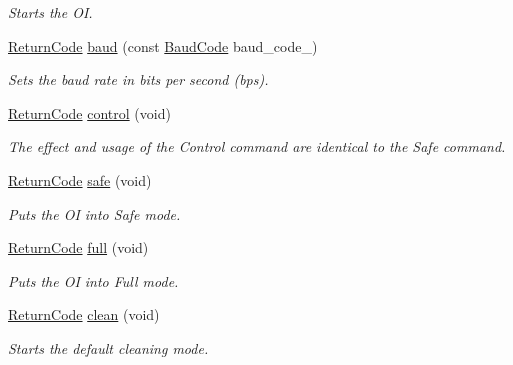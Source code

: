 \begin{DoxyCompactItemize}
\begin{DoxyCompactList}\small\item\em Starts the O\+I. \end{DoxyCompactList}\item 
\hyperlink{classroomba_1_1series500_1_1oi_1_1_o_i_command_ab408b9562318caf292794d8ba335d5ed}{Return\+Code} \hyperlink{classroomba_1_1series500_1_1oi_1_1_o_i_command_a664f31d7b82085b64bae23e1a6f9f516}{baud} (const \hyperlink{namespaceroomba_1_1series500_1_1oi_ae5028fe52e1dabe309aff04a45581bfd}{Baud\+Code} baud\+\_\+code\+\_\+)
\begin{DoxyCompactList}\small\item\em Sets the baud rate in bits per second (bps). \end{DoxyCompactList}\item 
\hyperlink{classroomba_1_1series500_1_1oi_1_1_o_i_command_ab408b9562318caf292794d8ba335d5ed}{Return\+Code} \hyperlink{classroomba_1_1series500_1_1oi_1_1_o_i_command_ad19717e95684fb6d603741315b333551}{control} (void)
\begin{DoxyCompactList}\small\item\em The effect and usage of the Control command are identical to the Safe command. \end{DoxyCompactList}\item 
\hyperlink{classroomba_1_1series500_1_1oi_1_1_o_i_command_ab408b9562318caf292794d8ba335d5ed}{Return\+Code} \hyperlink{classroomba_1_1series500_1_1oi_1_1_o_i_command_a3bb456935cf703ff770ef8dac5409739}{safe} (void)
\begin{DoxyCompactList}\small\item\em Puts the O\+I into Safe mode. \end{DoxyCompactList}\item 
\hyperlink{classroomba_1_1series500_1_1oi_1_1_o_i_command_ab408b9562318caf292794d8ba335d5ed}{Return\+Code} \hyperlink{classroomba_1_1series500_1_1oi_1_1_o_i_command_abbebe3edde0e2e9b697c2678cb81a14c}{full} (void)
\begin{DoxyCompactList}\small\item\em Puts the O\+I into Full mode. \end{DoxyCompactList}\item 
\hyperlink{classroomba_1_1series500_1_1oi_1_1_o_i_command_ab408b9562318caf292794d8ba335d5ed}{Return\+Code} \hyperlink{classroomba_1_1series500_1_1oi_1_1_o_i_command_a1568d65b2de996365fb951226322e403}{clean} (void)
\begin{DoxyCompactList}\small\item\em Starts the default cleaning mode. \end{DoxyCompactList}\item 

\end{DoxyCompactItemize}
